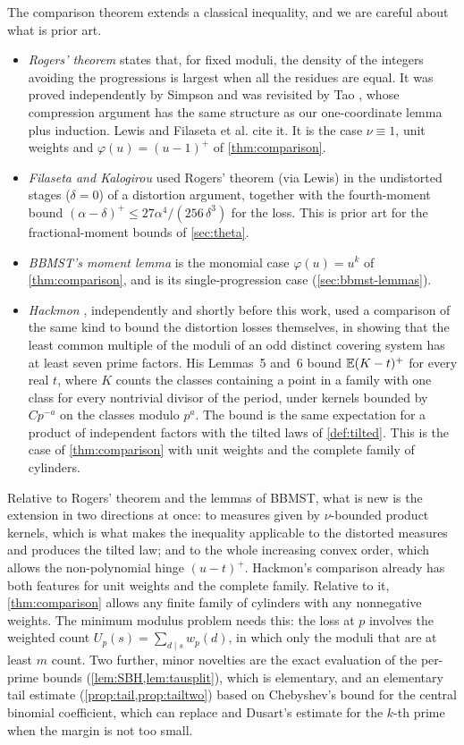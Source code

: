 The comparison theorem extends a classical inequality, and we are careful about what is prior art.
\begin{itemize}
\item \emph{Rogers' theorem} \cite[pp.~242--244]{HalberstamRoth1966} states that, for fixed moduli, the density of
  the integers avoiding the progressions is largest when all the residues are equal. It was proved independently by
  Simpson \cite[Lemma~2.3]{Simpson1986} and was revisited by Tao \cite{TaoRogers2026}, whose compression argument
  has the same structure as our one-coordinate lemma plus induction. Lewis \cite{Lewis1996} and Filaseta et al.
  \cite{FFKPY2007} cite it. It is the case $\nu\equiv1$, unit weights and $\varphi(u)=(u-1)^+$ of
  \cref{thm:comparison}.
\item \emph{Filaseta and Kalogirou} \cite{FilasetaKalogirou2026} used Rogers' theorem (via Lewis) in the
  undistorted stages ($\delta=0$) of a distortion argument, together with the fourth-moment bound
  $(\alpha-\delta)^+\le 27\alpha^4/(256\,\delta^3)$ for the loss. This is prior art for the fractional-moment bounds
  of \cref{sec:theta}.
\item \emph{BBMST's moment lemma} \cite[Lemma~3.6]{BBMST} is the monomial case $\varphi(u)=u^k$ of
  \cref{thm:comparison}, and \cite[Lemma~3.4]{BBMST} is its single-progression case (\cref{sec:bbmst-lemmas}).
\item \emph{Hackmon} \cite{Hackmon2026}, independently and shortly before this work, used a comparison of the
  same kind to bound the distortion losses themselves, in showing that the least common multiple of the moduli of an
  odd distinct covering system has at least seven prime factors. His Lemmas~5 and~6 bound $\mathbb{E}(K-t)^+$ for every
  real $t$, where $K$ counts the classes containing a point in a family with one class for every nontrivial divisor
  of the period, under kernels bounded by $Cp^{-a}$ on the classes modulo $p^a$. The bound is the same expectation
  for a product of independent factors with the tilted laws of \cref{def:tilted}. This is the case of
  \cref{thm:comparison} with unit weights and the complete family of cylinders.
\end{itemize}
Relative to Rogers' theorem and the lemmas of BBMST, what is new is the extension in two directions at once: to
measures given by $\nu$-bounded product kernels, which is what makes the inequality applicable to the distorted
measures and produces the tilted law; and to the whole increasing convex order, which allows the non-polynomial
hinge $(u-t)^+$. Hackmon's comparison already has both features for unit weights and the complete family.
Relative to it, \cref{thm:comparison} allows any finite family of cylinders with any nonnegative weights. The
minimum modulus problem needs this: the loss at $p$ involves the weighted count $U_p(s)=\sum_{d\mid s}w_p(d)$, in
which only the moduli that are at least $m$ count. Two further, minor novelties are the
exact evaluation of the per-prime bounds (\cref{lem:SBH,lem:tausplit}), which is elementary, and an elementary tail
estimate (\cref{prop:tail,prop:tailtwo}) based on Chebyshev's bound for the central binomial coefficient, which can replace
\cite[Theorem~6.1]{BBMST} and Dusart's estimate for the $k$-th prime when the margin is not too small.

